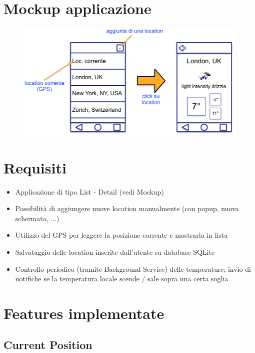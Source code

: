 \documentclass{article}
\begin{document}
\section{Mockup applicazione}
\begin{figure}[H]
    \center
    \includegraphics[scale=0.25]{images/fig3.png}
\end{figure}
\section{Requisiti}
\begin{itemize}
    \item Applicazione di tipo List - Detail (vedi Mockup)
    \item Possibilità di aggiungere nuove location manualmente (con popup, nuova
schermata, ...)
    \item Utilizzo del GPS per leggere la posizione corrente e mostrarla in lista
    \item Salvataggio delle location inserite dall'utente su database SQLite
    \item Controllo periodico (tramite Background Service) delle temperature; invio di
notifiche se la temperatura locale scende / sale sopra una certa soglia
\end{itemize}
\section{Features implementate}
\subsection{Current Position}
\end{document}
